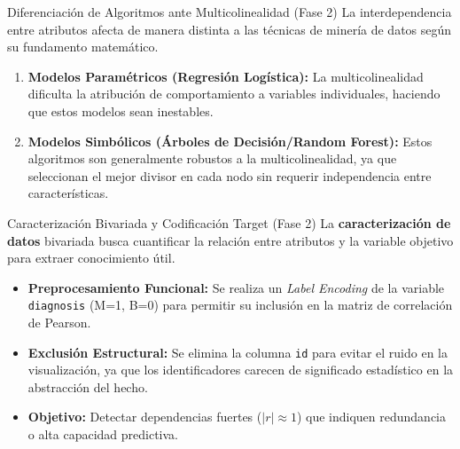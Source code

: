 \documentclass{beamer}
\begin{document}
	\begin{frame}{Diferenciación de Algoritmos ante Multicolinealidad (Fase 2)}
		La interdependencia entre atributos afecta de manera distinta a las técnicas de minería de datos según su fundamento matemático.
		
		\begin{enumerate}
			\item<2-> \textbf{Modelos Paramétricos (Regresión Logística):} La multicolinealidad dificulta la atribución de comportamiento a variables individuales, haciendo que estos modelos sean inestables.
			\item<3-> \textbf{Modelos Simbólicos (Árboles de Decisión/Random Forest):} Estos algoritmos son generalmente robustos a la multicolinealidad, ya que seleccionan el mejor divisor en cada nodo sin requerir independencia entre características.
		\end{enumerate}
	\end{frame}
	
	\begin{frame}{Caracterización Bivariada y Codificación Target (Fase 2)}
		La \textbf{caracterización de datos} bivariada busca cuantificar la relación entre atributos y la variable objetivo para extraer conocimiento útil.
		
		\begin{itemize}
			\item<2-> \textbf{Preprocesamiento Funcional:} Se realiza un \textit{Label Encoding} de la variable \texttt{diagnosis} (M=1, B=0) para permitir su inclusión en la matriz de correlación de Pearson.
			\item<3-> \textbf{Exclusión Estructural:} Se elimina la columna \texttt{id} para evitar el ruido en la visualización, ya que los identificadores carecen de significado estadístico en la abstracción del hecho.
			\item<4-> \textbf{Objetivo:} Detectar dependencias fuertes ($|r| \approx 1$) que indiquen redundancia o alta capacidad predictiva.
		\end{itemize}
	\end{frame}
	
\end{document}
